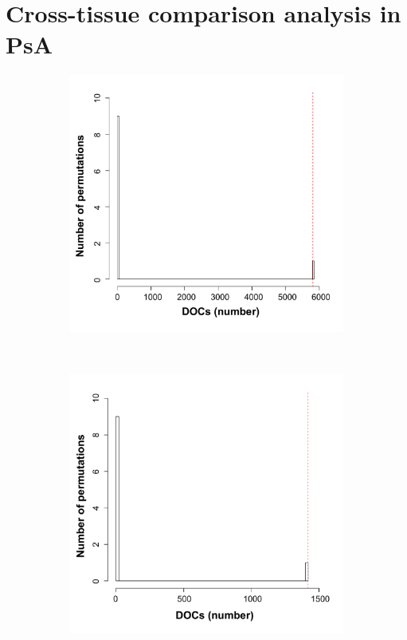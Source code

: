 \chapter{Cross-tissue comparison analysis in PsA}
\label{app:cross_tissue_PsA}

\bigskip
\begin{figure}[H]
\centering
\begin{subfigure}[b]{0.45\textwidth}
\centering 
\includegraphics[width=\textwidth]{./Appendix/pdfs/Chapter5/ATAC_PsA_CD14_permutation_analysis}
\caption{}
\end{subfigure}
~
\begin{subfigure}[b]{0.45\textwidth}
\centering 
\includegraphics[width=\textwidth]{./Appendix/pdfs/Chapter5/ATAC_PsA_CD4_permutation_analysis}

\end{subfigure}
\end{figure}
